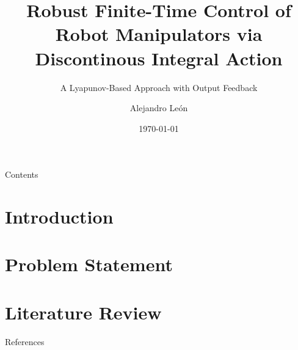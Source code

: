 \documentclass[aspectratio=169,xcolor=dvipsnames]{beamer}
\title{Robust Finite-Time Control of Robot Manipulators via Discontinous Integral Action}
\subtitle{A Lyapunov-Based Approach with Output Feedback}
\author{Alejandro León}
\institute
{
    Instituto de Ingeniería \\
    Universidad Nacional Autónoma de México %
}
\date{\today} %
\begin{document}
\begin{frame}
    \titlepage
\end{frame}

\begin{frame}{Contents}
    \tableofcontents
\end{frame}

\section{Introduction}


%

\section{Problem Statement}


\section{Literature Review}



\begin{frame}{References}
    \footnotesize
    
    
\end{frame}

\end{document}
